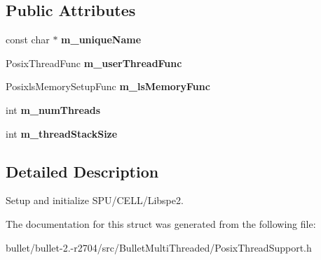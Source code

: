 \subsection*{Public Attributes}
\begin{DoxyCompactItemize}
\item 
\hypertarget{struct_posix_thread_support_1_1_thread_construction_info_a55fd6e795b8bf8f1b80a688dbd0b0348}{const char $\ast$ {\bfseries m\+\_\+unique\+Name}}\label{struct_posix_thread_support_1_1_thread_construction_info_a55fd6e795b8bf8f1b80a688dbd0b0348}

\item 
\hypertarget{struct_posix_thread_support_1_1_thread_construction_info_a35b4f2d4a84bcb4fc6d281ada1839a32}{Posix\+Thread\+Func {\bfseries m\+\_\+user\+Thread\+Func}}\label{struct_posix_thread_support_1_1_thread_construction_info_a35b4f2d4a84bcb4fc6d281ada1839a32}

\item 
\hypertarget{struct_posix_thread_support_1_1_thread_construction_info_a797e53245c408c76ad5736d7f34488b1}{Posixls\+Memory\+Setup\+Func {\bfseries m\+\_\+ls\+Memory\+Func}}\label{struct_posix_thread_support_1_1_thread_construction_info_a797e53245c408c76ad5736d7f34488b1}

\item 
\hypertarget{struct_posix_thread_support_1_1_thread_construction_info_a5d365490a2408a08040a5f7c2cc46814}{int {\bfseries m\+\_\+num\+Threads}}\label{struct_posix_thread_support_1_1_thread_construction_info_a5d365490a2408a08040a5f7c2cc46814}

\item 
\hypertarget{struct_posix_thread_support_1_1_thread_construction_info_a259f189f4c991e34f76945057b48acdd}{int {\bfseries m\+\_\+thread\+Stack\+Size}}\label{struct_posix_thread_support_1_1_thread_construction_info_a259f189f4c991e34f76945057b48acdd}

\end{DoxyCompactItemize}


\subsection{Detailed Description}
Setup and initialize S\+P\+U/\+C\+E\+L\+L/\+Libspe2. 

The documentation for this struct was generated from the following file\+:\begin{DoxyCompactItemize}
\item 
bullet/bullet-\/2.-\/r2704/src/\+Bullet\+Multi\+Threaded/Posix\+Thread\+Support.\+h\end{DoxyCompactItemize}
